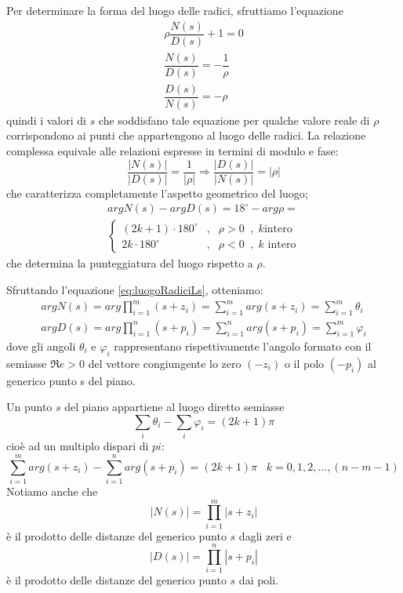 \documentclass[a4paper]{report}
\begin{document}
Per determinare la forma del luogo delle radici, sfruttiamo
l'equazione
\[
\begin{array}{l}
  \rho \dfrac{N(s)}{D(s)} + 1 = 0\\
  \dfrac{N(s)}{D(s)} = - \dfrac{1}{\rho}\\
  \dfrac{D(s)}{N(s)} = - \rho
\end{array}
\]
quindi i valori di $s$ che soddisfano tale equazione per qualche
valore reale di $\rho$ corrispondono ai punti che appartengono al
luogo delle radici. La relazione complessa equivale alle relazioni
espresse in termini di modulo e fase:
\begin{equation}\label{eq:luogoRadiciModulo}
  \dfrac{|N(s)|}{|D(s)|} = \dfrac{1}{|\rho|} \Rightarrow
  \dfrac{|D(s)|}{|N(s)|} = |\rho|
\end{equation}
che caratterizza completamente l'aspetto geometrico del luogo;
\begin{equation}\label{eq:luogoRadiciFasi}
  \begin{array}{l}
    arg N(s) - arg D(s) = 18^{\circ} - arg \rho = \\
    \left \{
    \begin{array}{lcl}
      (2k + 1)\cdot 180^{\circ} &,& \rho > 0 \;\;,\; k \textrm{
        intero}\\
      2k \cdot 180^{\circ} &,& \rho < 0 \;\;,\; k \textrm{ intero}
    \end{array}
    \right .
  \end{array}
\end{equation}
che determina la punteggiatura del luogo rispetto a $\rho$.

Sfruttando l'equazione \ref{eq:luogoRadiciLs}, otteniamo:
\begin{equation}
  \begin{array}{l}
    arg N(s) = arg \prod\limits_{i = 1}^{m} (s + z_i) = \sum_{i =
      1}^{m} arg (s + z_i) = \sum_{i = 1}^{m}\theta_i\\
    arg D(s) = arg \prod\limits_{i = 1}^{n} (s + p_i) = \sum_{i =
      1}^{n} arg (s + p_i) = \sum_{i = 1}^{m}\varphi_i
  \end{array}
\end{equation}
dove gli angoli $\theta_i$ e $\varphi_i$ rappresentano rispettivamente
l'angolo formato con il semiasse $\mathfrak{R}e > 0$ del vettore
congiungente lo zero $(-z_i)$ o il polo $(-p_i)$ al generico punto s
del piano.

Un punto $s$ del piano appartiene al luogo diretto semiasse
\[
\sum_i \theta_i - \sum_i \varphi_i = (2k + 1) \pi
\]
cio\`e ad un multiplo dispari di $pi$:
\[
\sum_{i = 1}^{m} arg (s + z_i) - \sum_{i = 1}^{n} arg (s + p_i) = (2k
+ 1) \pi \;\;\; k = 0,1,2,...,(n - m -1)
\]
Notiamo anche che
\[
|N(s)| = \prod\limits_{i = 1}^{m} |s + z_i|
\]
\`e il prodotto delle distanze del generico punto $s$ dagli zeri e
\[
|D(s)| = \prod\limits_{i = 1}^{n} |s + p_i|
\]
\`e il prodotto delle distanze del generico punto $s$ dai poli.
\end{document}
